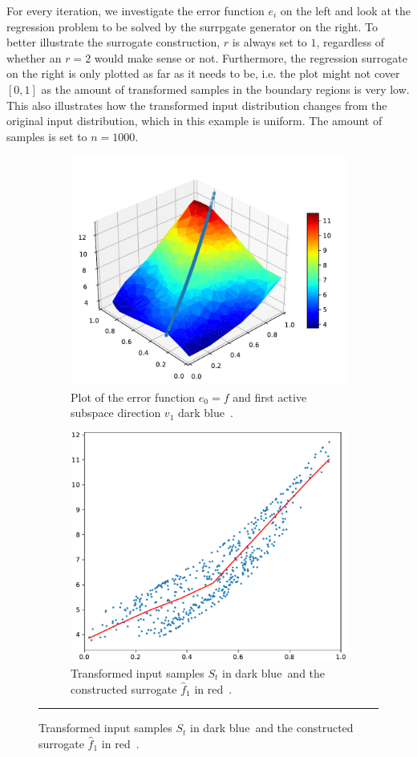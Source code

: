 \documentclass[
  a4paper,  %
  twoside,  %
  bibliography=totoc,
  headsepline,
  cleardoublepage=empty,
  parskip=half,
  draft=false
]{scrbook}
\newcommand{\Hsquare}{%
  \text{\fboxsep=-.2pt\fbox{\rule{0pt}{1.4ex}\rule{1.4ex}{0pt}}}%
}
\newcommand\red{red\,{\setlength\fboxsep{0pt}\colorbox{persian_red}{\Hsquare}} }
\newcommand\darkblue{dark blue\,{\setlength\fboxsep{0pt}\colorbox{charcoal}{\Hsquare}} }
\newcommand{\delimit}{{\color{charcoal}\noindent\rule{\textwidth}{1pt}}}
\begin{document}
For every iteration, we investigate the error function $e_i$ on the left and look at the regression problem to be solved by the surrpgate generator on the right.
To better illustrate the surrogate construction, $r$ is always set to $1$, regardless of whether an $r=2$ would make sense or not.
Furthermore, the regression surrogate on the right is only plotted as far as it needs to be, i.e. the plot might not cover $[0,1]$ as the amount of transformed samples in the boundary regions is very low.
This also illustrates how the transformed input distribution changes from the original input distribution, which in this example is uniform.
The amount of samples is set to $n=1000$.

\newpage
\begin{mdframed}[style=style]
\begin{figure}[H]
\begin{subfigure}{.5\textwidth}
  \centering
  \includegraphics[width=.8\linewidth]{graphics/pipeline_current_1}
  \caption{Plot of the error function $e_0=f$ and first active subspace direction $v_1$ \darkblue.}
\label{fig:pipeline_current_1}
\end{subfigure}%
\begin{subfigure}{.5\textwidth}
  \centering
  \includegraphics[width=.7\linewidth]{graphics/pipeline_local_1}
  \caption{Transformed input samples $S_t$ in \darkblue and the constructed surrogate $\hat{f}_1$ in \red.}
\label{fig:pipeline_local_1}
\end{subfigure}
\delimit
{}
\label{fig:pipeline_1}
\end{figure}
\end{mdframed}
\end{document}
